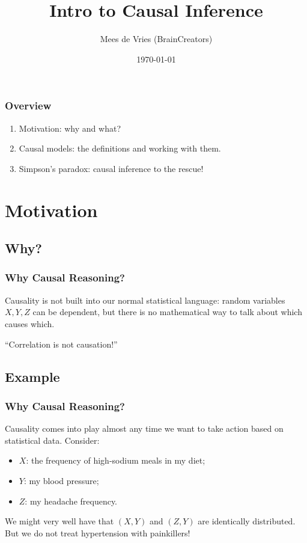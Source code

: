 \documentclass{beamer}
\title{Intro to Causal Inference}
\author{Mees de Vries (BrainCreators)}
\date{\today}
\begin{document}
\maketitle

\begin{frame}
    \frametitle{Overview}
    \begin{enumerate}
        \item Motivation: why and what?
        \item Causal models: the definitions and working with them.
        \item Simpson's paradox: causal inference to the rescue!
    \end{enumerate}
\end{frame}

\section{Motivation}
\subsection{Why?}
\begin{frame}
    \frametitle{Why Causal Reasoning?}
    Causality is not built into our normal statistical language: random
    variables $X, Y, Z$ can be dependent, but there is no mathematical way to
    talk about which causes which.\pause\bigskip

    \begin{center}
        ``Correlation is not causation!''
    \end{center}
\end{frame}

\subsection{Example}
\begin{frame}
    \frametitle{Why Causal Reasoning?}
    Causality comes into play almost any time we want to take action
    based on statistical data. Consider:
    \begin{itemize}
        \item $X$: the frequency of high-sodium meals in my diet;
        \item $Y$: my blood pressure;
        \item $Z$: my headache frequency.\pause
    \end{itemize}
    We might very well have that $(X,Y)$ and $(Z, Y)$ are identically
    distributed. But we do not treat hypertension with painkillers!
\end{frame}
\end{document}
